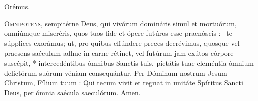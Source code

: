 
{\centering Orémus.\par}

\lettrine{O}{mnipotens}, sempitérne Deus, 
qui vivórum domináris simul et mortuórum, 
omniúmque miseréris, quos tuos fide et ópere futúros
esse praenóscis : \dag\ te súpplices exorámus;
ut, pro quibus effúndere
preces decrévimus, quosque vel
praesens saéculum adhuc in carne
rétinet, vel futúrum jam exútos
córpore suscépit, * intercedéntibus
ómnibus Sanctis tuis, pietátis tuae
cleméntia ómnium delictórum suórum 
véniam consequántur.  Per Dóminum
nostrum Jesum Christum,
Fílium tuum : Qui tecum vivit et 
regnat in unitáte Spíritus Sancti 
Deus, per ómnia saécula saeculórum.  \Rbar Amen.


